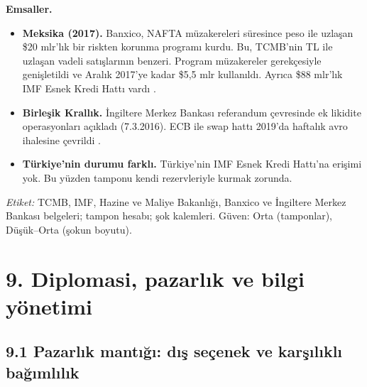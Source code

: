 \endgroup

\textbf{Emsaller.}

\begin{itemize}
\tightlist
\item
  \textbf{Meksika (2017).} Banxico, NAFTA müzakereleri süresince peso ile uzlaşan \$20 mlr'lık bir riskten korunma programı kurdu. Bu, TCMB'nin TL ile uzlaşan vadeli satışlarının benzeri. Program müzakereler gerekçesiyle genişletildi ve Aralık 2017'ye kadar \$5,5 mlr kullanıldı. Ayrıca \$88 mlr'lık IMF Esnek Kredi Hattı vardı \etiketV{}.
\item
  \textbf{Birleşik Krallık.} İngiltere Merkez Bankası referandum çevresinde ek likidite operasyonları açıkladı (7.3.2016). ECB ile swap hattı 2019'da haftalık avro ihalesine çevrildi \etiketV{}.
\item
  \textbf{Türkiye'nin durumu farklı.} Türkiye'nin IMF Esnek Kredi Hattı'na erişimi yok. Bu yüzden tamponu kendi rezervleriyle kurmak zorunda.
\end{itemize}

\emph{Etiket:} \etiketV{} TCMB, IMF, Hazine ve Maliye Bakanlığı, Banxico ve İngiltere Merkez Bankası belgeleri; \etiketT{} tampon hesabı; \etiketH{} şok kalemleri. Güven: Orta (tamponlar), Düşük--Orta (şokun boyutu).

\hypertarget{02c_hazirlik-9-diplomasi-pazarlux131k-ve-bilgi-yuxf6netimi}{%
\section{9. Diplomasi, pazarlık ve bilgi yönetimi}\label{02c_hazirlik-9-diplomasi-pazarlux131k-ve-bilgi-yuxf6netimi}}

\hypertarget{02c_hazirlik-91-pazarlux131k-mantux131ux11fux131-dux131ux15f-seuxe7enek-ve-karux15fux131lux131klux131-baux11fux131mlux131lux131k}{%
\subsection{9.1 Pazarlık mantığı: dış seçenek ve karşılıklı bağımlılık}\label{02c_hazirlik-91-pazarlux131k-mantux131ux11fux131-dux131ux15f-seuxe7enek-ve-karux15fux131lux131klux131-baux11fux131mlux131lux131k}}

